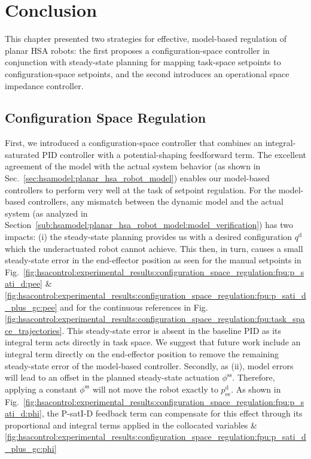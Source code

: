 \section{Conclusion}
This chapter presented two strategies for effective, model-based regulation of planar \gls{HSA} robots: the first proposes a configuration-space controller in conjunction with steady-state planning for mapping task-space setpoints to configuration-space setpoints, and the second introduces an operational space impedance controller.

\subsection{Configuration Space Regulation}

First, we introduced a configuration-space controller that combines an integral-saturated PID controller with a potential-shaping feedforward term.
The excellent agreement of the model with the actual system behavior (as shown in Sec.~\ref{sec:hsamodel:planar_hsa_robot_model}) enables our model-based controllers to perform very well at the task of setpoint regulation.
For the model-based controllers, any mismatch between the dynamic model and the actual system (as analyzed in Section~\ref{sub:hsamodel:planar_hsa_robot_model:model_verification}) has two impacts: (i) the steady-state planning provides us with a desired configuration $q^\mathrm{d}$ which the underactuated robot cannot achieve. This then, in turn, causes a small steady-state error in the end-effector position as seen for the manual setpoints in Fig.~\ref{fig:hsacontrol:experimental_results:configuration_space_regulation:fpu:p_sati_d:pee} \& \ref{fig:hsacontrol:experimental_results:configuration_space_regulation:fpu:p_sati_d_plus_gc:pee} 
and for the continuous references in Fig.\ref{fig:hsacontrol:experimental_results:configuration_space_regulation:fpu:task_space_trajectories}. This steady-state error is absent in the baseline PID as its integral term acts directly in task space. We suggest that future work include an integral term directly on the end-effector position to remove the remaining steady-state error of the model-based controller. Secondly, as (ii), model errors will lead to an offset in the planned steady-state actuation $\phi^\mathrm{ss}$. Therefore, applying a constant $\phi^\mathrm{ss}$ will not move the robot exactly to $p_\mathrm{ee}^\mathrm{d}$. As shown in Fig.~\ref{fig:hsacontrol:experimental_results:configuration_space_regulation:fpu:p_sati_d:phi}, the P-satI-D feedback term can compensate for this effect through its proportional and integral terms applied in the collocated variables \& \ref{fig:hsacontrol:experimental_results:configuration_space_regulation:fpu:p_sati_d_plus_gc:phi} 
